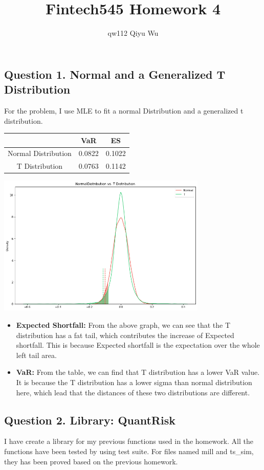 \documentclass[a4paper,12pt]{article}
\title{Fintech545 Homework 4}
\author{qw112 Qiyu Wu}
\date{}
\begin{document}
\maketitle
\subsection*{Question 1. Normal and a Generalized T Distribution}
For the problem, I use MLE to fit a normal Distribution and a generalized t distribution.
\begin{center}
    \begin{tabular}{ |c|c|c|}
     \hline
       & VaR & ES\\
     \hline
     Normal Distribution&0.0822&0.1022\\
     T Distribution&0.0763&0.1142\\
     \hline
    \end{tabular}
\end{center}
\begin{center}
    \includegraphics[width=10cm]{output.png}
\end{center}
\begin{itemize}
    \item \textbf{Expected Shortfall: } From the above graph, we can see that the T distribution has a fat tail, which contributes the increase of Expected shortfall. This is because Expected shortfall is the expectation over the whole left tail area.
    \item \textbf{VaR: } From the table, we can find that T distribution has a lower VaR value. It is because the T distribution has a lower sigma than normal distribution here, which lead that the distances of these two distributions are different.
\end{itemize}

\subsection*{Question 2. Library: QuantRisk}
I have create a library for my previous functions used in the homework. All the functions have been tested by using test suite. For files named mill and ts\_sim, they has been proved based on the previous homework.
\end{document}
